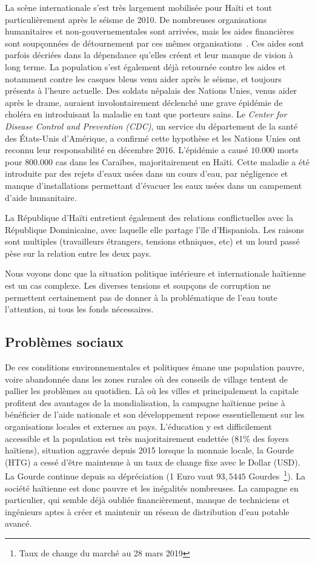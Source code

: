 \documentclass{EPL-master-thesis-covers-FR}
\begin{document}
				La scène internationale s'est très largement mobilisée pour Haïti et tout particulièrement après le séisme de 2010. De nombreuses organisations humanitaires et non-gouvernementales sont arrivées, mais les aides financières sont soupçonnées de détournement par ces mêmes organisations~\cite{ref:analyse_contextuelle_commune}. Ces aides sont parfois décriées dans la dépendance qu'elles créent et leur manque de vision à long terme. La population s'est également déjà retournée contre les aides et notamment contre les casques bleus venu aider après le séisme, et toujours présents à l'heure actuelle. Des soldats népalais des Nations Unies, venus aider après le drame, auraient involontairement déclenché une grave épidémie de choléra en introduisant la maladie en tant que porteurs sains. Le \emph{Center for Disease Control and Prevention (CDC)}, un service du département de la santé des \'Etats-Unis d'Amérique, a confirmé cette hypothèse et les Nations Unies ont reconnu leur responsabilité en décembre 2016. L'épidémie a causé $10.000$ morts pour $800.000$ cas dans les Caraïbes, majoritairement en Haïti. Cette maladie a été introduite par des rejets d'eaux usées dans un cours d'eau, par négligence et manque d'installations permettant d'évacuer les eaux usées dans un campement d'aide humanitaire.

				La République d'Haïti entretient également des relations conflictuelles avec la République Dominicaine, avec laquelle elle partage l'île d'Hispaniola. Les raisons sont multiples (travailleurs étrangers, tensions ethniques, etc) et un lourd passé pèse sur la relation entre les deux pays.

				Nous voyons donc que la situation politique intérieure et internationale haïtienne est un cas complexe. Les diverses tensions et soupçons de corruption ne permettent certainement pas de donner à la problématique de l'eau toute l'attention, ni tous les fonds nécessaires.

			\subsection*{Problèmes sociaux}

				De ces conditions environnementales et politiques émane une population pauvre, voire abandonnée dans les zones rurales où des conseils de village tentent de pallier les problèmes au quotidien. Là où les villes et principalement la capitale profitent des avantages de la mondialisation, la campagne haïtienne peine à bénéficier de l'aide nationale et son développement repose essentiellement sur les organisations locales et externes au pays. L'éducation y est difficilement accessible et la population est très majoritairement endettée (81\% des foyers haïtiens), situation aggravée depuis 2015 lorsque la monnaie locale, la Gourde (HTG) a cessé d'être maintenue à un taux de change fixe avec le Dollar (USD). La Gourde continue depuis sa dépréciation (1 Euro vaut $93,5445$ Gourdes~\footnote{Taux de change du marché au 28 mars 2019}). La société haïtienne est donc pauvre et les inégalités nombreuses. La campagne en particulier, qui semble déjà oubliée financièrement, manque de techniciens et ingénieurs aptes à créer et maintenir un réseau de distribution d'eau potable avancé.
\end{document}
